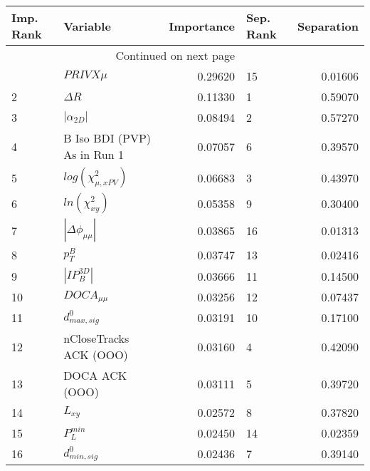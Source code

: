 \usepackage{lscape}

\begin{landscape}
\begin{longtable}{llrlr}
\toprule
Imp. Rank &                     Variable &  Importance & Sep. Rank &  Separation \\
\midrule
\endhead
\midrule
\multicolumn{3}{r}{{Continued on next page}} \\
\midrule
\endfoot

\bottomrule
\endlastfoot
        1 &                   $PRIVX\mu$ &     0.29620 &        15 &     0.01606 \\
        2 &                   $\Delta R$ &     0.11330 &         1 &     0.59070 \\
        3 &              $|\alpha_{2D}|$ &     0.08494 &         2 &     0.57270 \\
        4 &  B Iso BDI (PVP) As in Run 1 &     0.07057 &         6 &     0.39570 \\
        5 &    $log(\chi^{2}_{\mu,xPV})$ &     0.06683 &         3 &     0.43970 \\
        6 &          $ln(\chi^{2}_{xy})$ &     0.05358 &         9 &     0.30400 \\
        7 &     $|\Delta \phi_{\mu\mu}|$ &     0.03865 &        16 &     0.01313 \\
        8 &                    $p^B_{T}$ &     0.03747 &        13 &     0.02416 \\
        9 &              $|IP_{B}^{3D}|$ &     0.03666 &        11 &     0.14500 \\
       10 &              $DOCA_{\mu\mu}$ &     0.03256 &        12 &     0.07437 \\
       11 &             $d^0_{max, sig}$ &     0.03191 &        10 &     0.17100 \\
       12 &       nCloseTracks ACK (OOO) &     0.03160 &         4 &     0.42090 \\
       13 &               DOCA ACK (OOO) &     0.03111 &         5 &     0.39720 \\
       14 &                     $L_{xy}$ &     0.02572 &         8 &     0.37820 \\
       15 &                $P^{min}_{L}$ &     0.02450 &        14 &     0.02359 \\
       16 &             $d^0_{min, sig}$ &     0.02436 &         7 &     0.39140 \\
\end{longtable}

\end{landscape}
